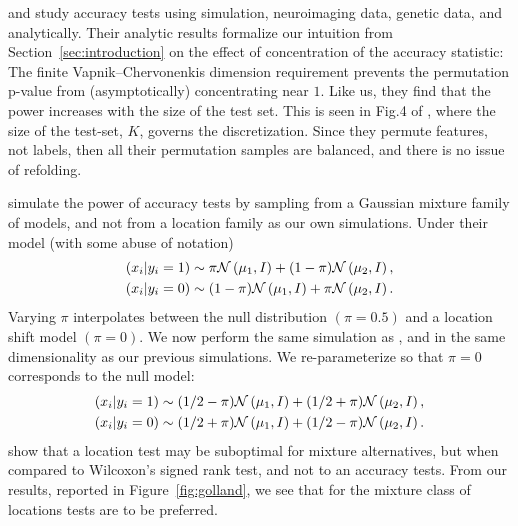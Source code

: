 \documentclass[12pt,a4paper]{article}
\begin{document}
\cite{golland_permutation_2003} and \cite{golland_permutation_2005} study accuracy tests using simulation, neuroimaging data, genetic data, and analytically.
Their analytic results formalize our intuition from Section~\ref{sec:introduction} on the effect of concentration of the accuracy statistic:
The finite Vapnik–Chervonenkis dimension requirement \citep[Sec 4.3]{golland_permutation_2005} prevents the permutation p-value from (asymptotically) concentrating near $1$. 
Like us, they find that the power increases with the size of the test set. 
This is seen in Fig.4 of \citet{golland_permutation_2005}, where the size of the test-set, $K$, governs the discretization. 
Since they permute features, not labels, then all their permutation samples are balanced, and there is no issue of refolding. 

\cite{golland_permutation_2005} simulate the power of accuracy tests by sampling from a Gaussian mixture family of models, and not from a location family as our own simulations. 
Under their model (with some abuse of notation)
\begin{align*}
\begin{split}
	(x_i|y_i=1) & \sim \pi \mathcal{N}\left(\mu_1,I\right)+ (1-\pi) \mathcal{N}\left(\mu_2,I\right), \\
	(x_i|y_i=0) & \sim (1-\pi) \mathcal{N}\left(\mu_1,I\right)+ \pi \mathcal{N}\left(\mu_2,I\right).
\end{split}
\end{align*}
Varying $\pi$ interpolates between the null distribution $(\pi=0.5)$ and a location shift model $(\pi=0)$. 
We now perform the same simulation as \cite{golland_permutation_2005}, and in the same dimensionality as our previous simulations.
We re-parameterize so that $\pi=0$ corresponds to the null model:
\begin{align}
\begin{split}
\label{eq:mixture_alternative}
	(x_i|y_i=1) & \sim (1/2-\pi) \mathcal{N}\left(\mu_1,I\right)+ (1/2+\pi) \mathcal{N}\left(\mu_2,I\right), \\
	(x_i|y_i=0) & \sim (1/2+\pi) \mathcal{N}\left(\mu_1,I\right)+ (1/2-\pi) \mathcal{N}\left(\mu_2,I\right).	
\end{split}
\end{align}
\citet{rosenblatt2017mixture} show that a location test may be suboptimal for mixture alternatives, but when compared to Wilcoxon's signed rank test, and not to an accuracy tests.
From our results, reported in Figure~\ref{fig:golland}, we see that for the mixture class of \cite{golland_permutation_2005} locations tests are to be preferred.
\end{document}

